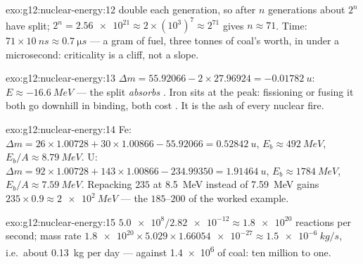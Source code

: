 \begin{solution}{exo:g12:nuclear-energy:12}
 double each generation, so after $n$ generations about $2^n$
have split; $2^{n} = \num{2.56e21} \approx 2 \times (10^{3})^{7}
\approx 2^{71}$ gives $n \approx 71$. Time: $71 \times \qty{10}{ns}
\approx \qty{0.7}{\micro s}$ --- a gram of fuel, three tonnes of coal's
worth, in under a microsecond: criticality is a cliff, not a slope.
\end{solution}

\begin{solution}{exo:g12:nuclear-energy:13}
$\Delta m = 55.92066 - 2 \times 27.96924 = \qty{-0.01782}{u}$:
$E \approx \qty{-16.6}{MeV}$ --- the split \emph{absorbs} .
Iron sits at the peak: fissioning or fusing it both go downhill in
binding, both cost . It is the ash of every nuclear fire.
\end{solution}

\begin{solution}{exo:g12:nuclear-energy:14}
Fe: $\Delta m = 26 \times 1.00728 + 30 \times 1.00866 - 55.92066 =
\qty{0.52842}{u}$, $E_b \approx \qty{492}{MeV}$, $E_b/A \approx
\qty{8.79}{MeV}$. U: $\Delta m = 92 \times 1.00728 + 143 \times
1.00866 - 234.99350 = \qty{1.91464}{u}$, $E_b \approx \qty{1784}{MeV}$,
$E_b/A \approx \qty{7.59}{MeV}$. Repacking $235$  at
\qty{8.5}{MeV} instead of \qty{7.59}{MeV} gains $235 \times 0.9
\approx \qty{2e2}{MeV}$ --- the $185$--$200$ of the worked example.
\end{solution}

\begin{solution}{exo:g12:nuclear-energy:15}
$\num{5.0e8}/\num{2.82e-12} \approx \num{1.8e20}$ reactions per
second; mass rate $\num{1.8e20} \times 5.029 \times \num{1.66054e-27}
\approx \qty{1.5e-6}{kg/s}$, i.e.\ about \qty{0.13}{kg} per day ---
against \num{1.4e6}  of coal: ten million to one.
\end{solution}

